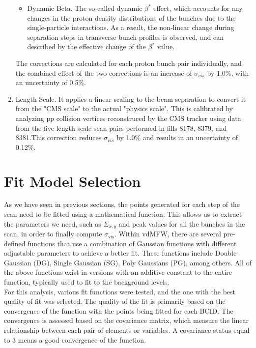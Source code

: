 \begin{enumerate}
\begin{itemize}
\item Dynamic Beta. The so-called dynamic $\beta^{*}$  effect, which accounts for any changes in the proton density distributions of the bunches due to the single-particle interactions. As a result, the non-linear change during separation steps in transverse bunch profiles is observed, and can described by the effective change of the $\beta^{*}$  value.
\end{itemize}
The corrections are calculated for each proton bunch pair individually, and the combined effect of the two corrections is an increase of $\sigma_{vis}$ by 1.0\%, with an uncertainty of 0.5\%.

\item Length Scale.  It applies a linear scaling to the beam separation to convert it from the "CMS scale" to the actual "physics scale". This is  calibrated by analyzing pp collision vertices reconstruced by the CMS tracker using data from the five length scale scan pairs performed in fills 8178, 8379, and 8381.This correction reduces $\sigma_{vis}$ by 1.0\% and results in an uncertainty of 0.12\%.

\end{enumerate}

\section{Fit Model  Selection}

As we have seen in previous sections, the points generated for each step of the scan need to be fitted using a mathematical function. This allows us to extract the parameters we need, such as $\Sigma_{x,y}$ and peak values for all the bunches in the scan, in order to finally compute $\sigma_{\text{vis}}$. Within vdMFW, there are several pre-defined functions that use a combination of Gaussian functions with different adjustable parameters to achieve a better fit. These functions include Double Gaussian (DG), Single Gaussian (SG), Poly Gaussians (PG), among others. All of the above functions exist in versions with an additive constant to the entire function, typically used to fit to the background levels.\\

For this analysis, various fit functions were tested, and the one with the best quality of fit was selected. The quality of the fit is primarily based on the convergence of the function with the points being fitted for each BCID. The convergence is assessed based on the covariance matrix, which measure the linear relationship between each pair of elements or variables. A  covariance status equal to 3 means a good convergence of the function.\\ 

